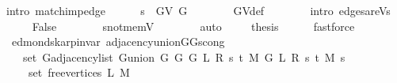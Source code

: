 \begin{isabellebody}
\ {\isacharparenleft}{\kern0pt}intro\ match{\isacharunderscore}{\kern0pt}imp{\isacharunderscore}{\kern0pt}edge{\isacharparenright}{\kern0pt}\isanewline
\ \ \ \ \isamarkupfalse%
\ {\isachardoublequoteopen}s\ {\isasymin}\ G{\isachardot}{\kern0pt}V\ G{\isachardoublequoteclose}\isanewline
\ \ \ \ \ \ \isamarkupfalse%
\ G{\isachardot}{\kern0pt}V{\isacharunderscore}{\kern0pt}def\isanewline
\ \ \ \ \ \ \isamarkupfalse%
\ {\isacharparenleft}{\kern0pt}intro\ edges{\isacharunderscore}{\kern0pt}are{\isacharunderscore}{\kern0pt}Vs{\isacharparenright}{\kern0pt}\isanewline
\ \ \ \ \isamarkupfalse%
\ False\isanewline
\ \ \ \ \ \ \isamarkupfalse%
\ s{\isacharunderscore}{\kern0pt}not{\isacharunderscore}{\kern0pt}mem{\isacharunderscore}{\kern0pt}V\isanewline
\ \ \ \ \ \ \isamarkupfalse%
\ auto\ \isacommand{{\isacharbraceright}{\kern0pt}}\isamarkupfalse%
\isanewline
\ \ \isamarkupfalse%
\ {\isacharquery}{\kern0pt}thesis\isanewline
\ \ \ \ \isamarkupfalse%
\ fastforce\isanewline
{}\isamarkupfalse%
%
\endisatagproof
{\isafoldproof}%
%
\isadelimproof
\isanewline
%
\endisadelimproof
%
\isadeliminvisible
\isanewline
%
\endisadeliminvisible
%
\isataginvisible
{}\isamarkupfalse%
\ {\isacharparenleft}{\kern0pt}\ edmonds{\isacharunderscore}{\kern0pt}karp{\isacharunderscore}{\kern0pt}invar{\isacharparenright}{\kern0pt}\ adjacency{\isacharunderscore}{\kern0pt}union{\isacharunderscore}{\kern0pt}G{}{\isacharunderscore}{\kern0pt}G{}{\isacharunderscore}{\kern0pt}s{\isacharunderscore}{\kern0pt}cong{\isacharcolon}{\kern0pt}\isanewline
\ \ \isanewline
\ \ \ \ {\isachardoublequoteopen}set\ {\isacharparenleft}{\kern0pt}G{\isachardot}{\kern0pt}adjacency{\isacharunderscore}{\kern0pt}list\ {\isacharparenleft}{\kern0pt}G{\isachardot}{\kern0pt}union\ {\isacharparenleft}{\kern0pt}G{}\ G\ {\isacharparenleft}{\kern0pt}G{}\ L\ R\ s\ t\ M{\isacharparenright}{\kern0pt}{\isacharparenright}{\kern0pt}\ {\isacharparenleft}{\kern0pt}G{}\ L\ R\ s\ t\ M{\isacharparenright}{\kern0pt}{\isacharparenright}{\kern0pt}\ s{\isacharparenright}{\kern0pt}\ {\isacharequal}{\kern0pt}\isanewline
\ \ \ \ \ set\ {\isacharparenleft}{\kern0pt}free{\isacharunderscore}{\kern0pt}vertices\ L\ M{\isacharparenright}{\kern0pt}{\isachardoublequoteclose}%
\endisataginvisible
{\isafoldinvisible}%
%
\isadeliminvisible
\isanewline
%
\endisadeliminvisible
%
\isadelimproof
%
\endisadelimproof

\end{isabellebody}
